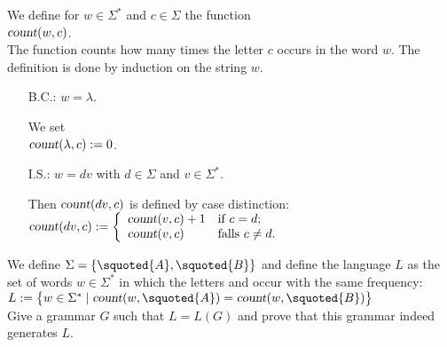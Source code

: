 \exerciseEng
We define for $w \in \Sigma^*$ and $c \in \Sigma$ the function
\\[0.2cm]
\hspace*{1.3cm}
$\textsl{count}(w,c)$.
\\[0.2cm]
The function counts how many times the letter $c$ occurs in the word $w$.  The definition is done by induction
on the string $w$.
\begin{enumerate}
\item[B.C.:] $w = \lambda$.  

            We set
            \\[0.2cm]
            \hspace*{1.3cm}
            $\textsl{count}(\lambda, c) := 0$.
\item[I.S.:] $w = dv$ with $d \in \Sigma$ and $v \in \Sigma^*$.  

            Then $\textsl{count}(dv,c)$ is defined by case distinction:
            \\[0.2cm]
            \hspace*{1.3cm}
            $\textsl{count}(dv,c) := \left\{
             \begin{array}[c]{llr}
               \textsl{count}(v,c) + 1 & \mbox{if $c = d$};    \\
               \textsl{count}(v,c) & \mbox{falls $c \not= d$}. \\
             \end{array}\right.
            $ \eox
\end{enumerate}
We define $\Sigma = \{ \squoted{A}, \squoted{B} \}$ and define the language $L$ as the
set of words $w\in\Sigma^*$ in which the letters  and  occur with the
same frequency:
\\[0.2cm]
\hspace*{1.3cm}
$L := \bigl\{ w \in \Sigma^* \mid \textsl{count}(w,\squoted{A}) = \textsl{count}(w,\squoted{B})\bigr\}$
\\[0.2cm]
Give a grammar $G$ such that $L = L(G)$ and prove that this grammar indeed generates $L$.
\eox

